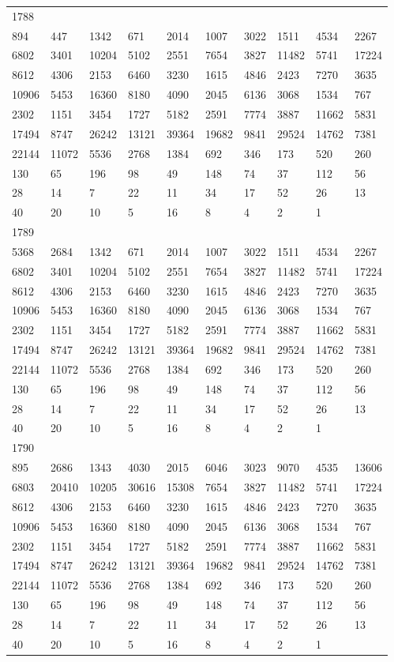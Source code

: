\begin{longtable}{*{10}{l}}
1788&&&&&&&&&\\
894& 447& 1342& 671& 2014& 1007& 3022& 1511& 4534& 2267\\
6802& 3401& 10204& 5102& 2551& 7654& 3827& 11482& 5741& 17224\\
8612& 4306& 2153& 6460& 3230& 1615& 4846& 2423& 7270& 3635\\
10906& 5453& 16360& 8180& 4090& 2045& 6136& 3068& 1534& 767\\
2302& 1151& 3454& 1727& 5182& 2591& 7774& 3887& 11662& 5831\\
17494& 8747& 26242& 13121& 39364& 19682& 9841& 29524& 14762& 7381\\
22144& 11072& 5536& 2768& 1384& 692& 346& 173& 520& 260\\
130& 65& 196& 98& 49& 148& 74& 37& 112& 56\\
28& 14& 7& 22& 11& 34& 17& 52& 26& 13\\
40& 20& 10& 5& 16& 8& 4& 2& 1& \\

1789&&&&&&&&&\\
5368& 2684& 1342& 671& 2014& 1007& 3022& 1511& 4534& 2267\\
6802& 3401& 10204& 5102& 2551& 7654& 3827& 11482& 5741& 17224\\
8612& 4306& 2153& 6460& 3230& 1615& 4846& 2423& 7270& 3635\\
10906& 5453& 16360& 8180& 4090& 2045& 6136& 3068& 1534& 767\\
2302& 1151& 3454& 1727& 5182& 2591& 7774& 3887& 11662& 5831\\
17494& 8747& 26242& 13121& 39364& 19682& 9841& 29524& 14762& 7381\\
22144& 11072& 5536& 2768& 1384& 692& 346& 173& 520& 260\\
130& 65& 196& 98& 49& 148& 74& 37& 112& 56\\
28& 14& 7& 22& 11& 34& 17& 52& 26& 13\\
40& 20& 10& 5& 16& 8& 4& 2& 1& \\

1790&&&&&&&&&\\
895& 2686& 1343& 4030& 2015& 6046& 3023& 9070& 4535& 13606\\
6803& 20410& 10205& 30616& 15308& 7654& 3827& 11482& 5741& 17224\\
8612& 4306& 2153& 6460& 3230& 1615& 4846& 2423& 7270& 3635\\
10906& 5453& 16360& 8180& 4090& 2045& 6136& 3068& 1534& 767\\
2302& 1151& 3454& 1727& 5182& 2591& 7774& 3887& 11662& 5831\\
17494& 8747& 26242& 13121& 39364& 19682& 9841& 29524& 14762& 7381\\
22144& 11072& 5536& 2768& 1384& 692& 346& 173& 520& 260\\
130& 65& 196& 98& 49& 148& 74& 37& 112& 56\\
28& 14& 7& 22& 11& 34& 17& 52& 26& 13\\
40& 20& 10& 5& 16& 8& 4& 2& 1& \\


\end{longtable}
